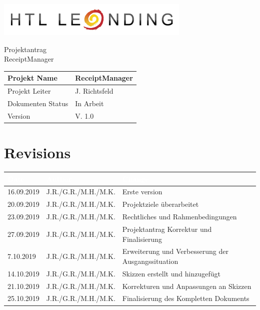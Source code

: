 \documentclass[12pt]{article}
\theoremstyle{definition}
\newcommand{\projectname}{ReceiptManager}
\newcommand{\productname}{ReceiptManager}
\newcommand{\projectleader}{J. Richtsfeld}
\newcommand{\documentstatus}{In Arbeit}
\newcommand{\version}{V. 1.0}
\begin{document}
\begin{titlepage}
\begin{flushright}
\includegraphics[scale=.5]{htlleondinglogo.png}
\end{flushright}



\vspace{10em}

\begin{center}
{\Huge Projektantrag} \\[3em]
{\LARGE \productname} \\[3em]
\end{center}

\begin{flushleft}
\begin{tabular}{|l|l|}
\hline
Projekt Name & \projectname \\ \hline
Projekt Leiter & \projectleader \\ \hline
Dokumenten Status & \documentstatus \\ \hline
Version & \version \\ \hline
\end{tabular}
\end{flushleft}

\end{titlepage}
\section*{Revisions}
\begin{tabular}{|l|l|l|}
\hline
\cellcolor[gray]{0.5}\textcolor{white}{Date} & \cellcolor[gray]{0.5}\textcolor{white}{Author} & \cellcolor[gray]{0.5}\textcolor{white}{Change} \\ \hline
16.09.2019&J.R./G.R./M.H./M.K.&Erste version \\ \hline
20.09.2019&J.R./G.R./M.H./M.K.&Projektziele überarbeitet \\ \hline
23.09.2019&J.R./G.R./M.H./M.K.&Rechtliches und Rahmenbedingungen \\ \hline
27.09.2019&J.R./G.R./M.H./M.K.&Projektantrag Korrektur und Finalisierung \\ \hline
7.10.2019&J.R./G.R./M.H./M.K.&Erweiterung und Verbesserung der Ausgangssituation \\ \hline
14.10.2019&J.R./G.R./M.H./M.K.&Skizzen erstellt und hinzugefügt \\ \hline
21.10.2019&J.R./G.R./M.H./M.K.&Korrekturen und Anpassungen an Skizzen\\ \hline
25.10.2019&J.R./G.R./M.H./M.K.&Finalisierung des Kompletten Dokuments\\ \hline
\end{tabular}
\pagebreak
\tableofcontents
\pagebreak
\end{document}
